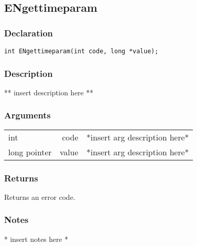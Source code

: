 \subsection{ENgettimeparam}
\subsubsection{Declaration}
\begin{lstlisting}
int ENgettimeparam(int code, long *value);
\end{lstlisting}
\subsubsection{Description}
** insert description here **
\subsubsection{Arguments}
\begin{tabular}{l r p{11cm} }
int&code&*insert arg description here* \\[6pt]
long pointer&value&*insert arg description here* \\[6pt]
\end{tabular}
\subsubsection{Returns}
Returns an error code.
\subsubsection{Notes}
* insert notes here *